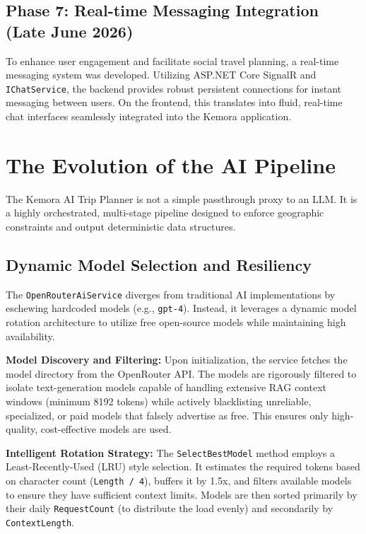 \subsection{Phase 7: Real-time Messaging Integration (Late June 2026)}
To enhance user engagement and facilitate social travel planning, a real-time messaging system was developed. Utilizing ASP.NET Core SignalR and \texttt{IChatService}, the backend provides robust persistent connections for instant messaging between users. On the frontend, this translates into fluid, real-time chat interfaces seamlessly integrated into the Kemora application.

\section{The Evolution of the AI Pipeline}
The Kemora AI Trip Planner is not a simple passthrough proxy to an LLM. It is a highly orchestrated, multi-stage pipeline designed to enforce geographic constraints and output deterministic data structures.

\subsection{Dynamic Model Selection and Resiliency}
The \texttt{OpenRouterAiService} diverges from traditional AI implementations by eschewing hardcoded models (e.g., \texttt{gpt-4}). Instead, it leverages a dynamic model rotation architecture to utilize free open-source models while maintaining high availability.

\textbf{Model Discovery and Filtering:}
Upon initialization, the service fetches the model directory from the OpenRouter API. The models are rigorously filtered to isolate text-generation models capable of handling extensive RAG context windows (minimum 8192 tokens) while actively blacklisting unreliable, specialized, or paid models that falsely advertise as free. This ensures only high-quality, cost-effective models are used.

\textbf{Intelligent Rotation Strategy:}
The \texttt{SelectBestModel} method employs a Least-Recently-Used (LRU) style selection. It estimates the required tokens based on character count (\texttt{Length / 4}), buffers it by 1.5x, and filters available models to ensure they have sufficient context limits. Models are then sorted primarily by their daily \texttt{RequestCount} (to distribute the load evenly) and secondarily by \texttt{ContextLength}.

